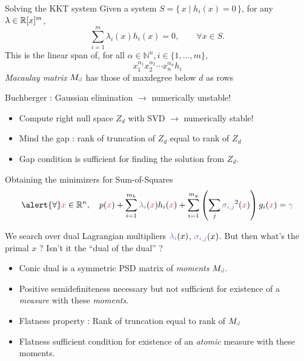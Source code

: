 \documentclass{beamer}
\newcommand{\symvar}[1]{\textcolor{julia_red}{#1}}
\newcommand{\decisionvar}[1]{\textcolor{julia_purple}{#1}}
\begin{document}
\begin{frame}{Solving the KKT system}
  Given a system $S = \{\, x \mid h_i(x) = 0 \,\}$, %
  for any $\lambda \in \mathbb{R}[x]^m$,
  \[
    \sum_{i=1}^m \lambda_i(x) h_i(x) = 0, \qquad \forall x \in S.
  \]
  This is the linear span of,
  for all $\alpha \in \mathbb{N}^n, i \in \{1, \ldots, m\}$,
  \[
    x_1^{\alpha_1}x_2^{\alpha_2} \cdots x_n^{\alpha_n} h_i
  \]
  \emph{\alert{Macaulay} matrix} $M_{\textcolor{julia_purple}{d}}$ has those of maxdegree below \textcolor{julia_purple}{$d$} as rows

  Buchberger : \alert{Gaussian elimination} $\to$ \alert{numerically unstable}!

  \begin{itemize}
    \item Compute right null space $Z_d$ with SVD $\to$ \alert{numerically stable}!
    \item \alert{Mind the gap} : rank of \textcolor{julia_purple}{truncation} of $Z_d$ equal to rank of $Z_d$
    \item Gap condition is \alert{sufficient} for finding the solution from $Z_d$.
  \end{itemize}
\end{frame}

\begin{frame}{Obtaining the minimizers for Sum-of-Squares}
    \[
      \alert{\forall} \symvar{x} \in \R^n, \quad p(\symvar{x}) + \sum_{i=1}^{m_h} \decisionvar{\lambda_i}(\symvar{x}) h_i(\symvar{x}) + \sum_{i=1}^{m_g} \left(\sum_j \decisionvar{\sigma_{i,j}}^2(\symvar{x})\right) g_i(\symvar{x}) = \decisionvar{\gamma}
    \]

  We search over \alert{dual} Lagrangian multipliers $\decisionvar{\lambda_i}(x)$, $\decisionvar{\sigma_{i,j}}(x)$.
  But then what's the \alert{primal} \symvar{$x$} ? Isn't it the ``dual of the dual'' ?

  \begin{itemize}
    \item \alert{Conic} dual is a symmetric \alert{PSD} matrix of \emph{moments} $M_{\textcolor{julia_purple}{d}}$.
    \item Positive semidefiniteness \alert{necessary} but not \alert{sufficient}
    for existence of a \emph{measure} with these \emph{moments}.
    \item \alert{Flatness property} : Rank of \textcolor{julia_purple}{truncation} equal to rank of $M_{\textcolor{julia_purple}{d}}$
    \item Flatness \alert{sufficient} condition for existence of an \emph{atomic}
    measure with these moments.
  \end{itemize}
\end{frame}
\end{document}
